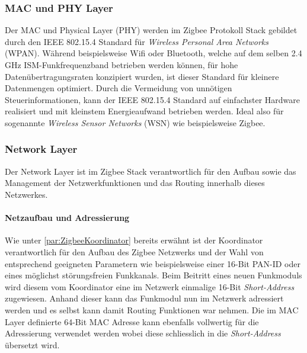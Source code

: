 \subsubsection{MAC und PHY Layer}\label{subsubsec:MACundPHYLayer}
Der MAC und Physical Layer (PHY) werden im Zigbee Protokoll Stack gebildet durch den IEEE 802.15.4 Standard für \textit{Wireless Personal Area Networks} (WPAN).
Während beispielsweise Wifi oder Bluetooth, welche auf dem selben 2.4 GHz ISM-Funkfrequenzband betrieben werden können, für hohe Datenübertragungsraten konzipiert wurden, ist dieser Standard für kleinere Datenmengen optimiert.
Durch die Vermeidung von unnötigen Steuerinformationen, kann der IEEE 802.15.4 Standard auf einfachster Hardware realisiert und mit kleinstem Energieaufwand betrieben werden.
Ideal also für sogenannte \textit{Wireless Sensor Networks} (WSN) wie beispielsweise Zigbee. \cite{markus_krause_rainer_konrad_ieee_2014}


\subsubsection{Network Layer}\label{subsubsec:Network Layer}
Der Network Layer ist im Zigbee Stack verantwortlich für den Aufbau sowie das Management der Netzwerkfunktionen und das Routing innerhalb dieses Netzwerkes.

\paragraph{Netzaufbau und Adressierung}\label{par:ZigbeeNetzaufbauundAdressierung}
Wie unter \ref{par:ZigbeeKoordinator} bereits erwähnt ist der Koordinator verantwortlich für den Aufbau des Zigbee Netzwerks und der Wahl von entsprechend geeigneten Parametern wie beispielsweise einer 16-Bit PAN-ID oder eines möglichst störungsfreien Funkkanals.
Beim Beitritt eines neuen Funkmoduls wird diesem vom Koordinator eine im Netzwerk einmalige 16-Bit \textit{Short-Address} zugewiesen.
Anhand dieser kann das Funkmodul nun im Netzwerk adressiert werden und es selbst kann damit Routing Funktionen war nehmen.
Die im MAC Layer definierte 64-Bit MAC Adresse kann ebenfalls vollwertig für die Adressierung verwendet werden wobei diese schliesslich in die \textit{Short-Address} übersetzt wird.



